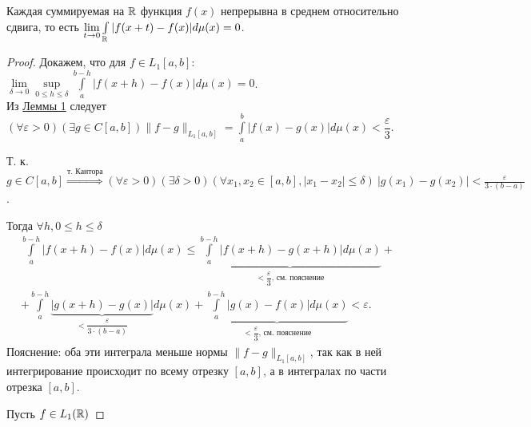 \begin{lemma}
	Каждая суммируемая на $\mathbb{R}$ функция $f(x)$ непрерывна в среднем относительно сдвига, то есть $\lim\limits_{t\to 0}\int\limits_{\mathbb{R}}|f(x+t)-f(x)|d\mu(x)=0$.
\end{lemma}
\begin{proof}
	Докажем, что для $f\in L_1[a,b]$: $\lim\limits_{\delta\to 0}\sup\limits_{0\leqslant h\leqslant \delta}\int\limits_{a}^{b-h}|f(x+h)-f(x)|d\mu(x)=0$.\\
	Из \hyperref[lemma_1]{Леммы 1} следует $(\forall\varepsilon >0)(\exists g\in C[a,b])\parallel f-g\parallel_{L_1[a,b]}=\int\limits_{a}^b|f(x)-g(x)|d\mu(x)<\dfrac{\varepsilon}{3}$.
	
	Т. к. $g\in C[a,b]\overset{\text{т. Кантора}}{\Rightarrow} (\forall\varepsilon>0)(\exists\delta>0)(\forall x_1,x_2\in[a,b],|x_1-x_2|\leqslant\delta)\ |g(x_1)-g(x_2)|<\frac{\varepsilon}{3\cdot (b-a)}$.
	
	Тогда $\forall h, 0\leqslant h \leqslant \delta$
	\begin{multline*}
		\int\limits_{a}^{b-h}|f(x+h)-f(x)|d\mu(x)\leqslant \underbrace{\int\limits_{a}^{b-h}|f(x+h)-g(x+h)|d\mu(x)}_{<\dfrac{\varepsilon}{3}\text{, см. пояснение}}+\\+
		\int\limits_{a}^{b-h}\underbrace{|g(x+h)-g(x)|}_{<\dfrac{\varepsilon}{3\cdot (b-a)}}d\mu(x)+
		\underbrace{\int\limits_{a}^{b-h}|g(x)-f(x)|d\mu(x)}_{<\dfrac{\varepsilon}{3}\text{, см. пояснение}}<\varepsilon. 
	\end{multline*}
Пояснение: оба эти интеграла меньше нормы $\parallel f-g\parallel_{L_1[a,b]}$, так как в ней интегрирование происходит по всему отрезку $[a,b]$, а в интегралах по части отрезка $[a,b]$.

Пусть $f\in L_1(\mathbb{R})$
\end{proof}
















































